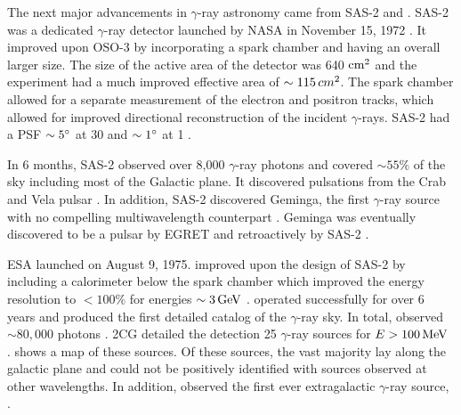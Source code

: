 The next major advancements in $\gamma$-ray astronomy
came from \ac{SAS-2} and \cosb.  \Ac{SAS-2} was a dedicated
$\gamma$-ray detector launched by \ac{NASA} in November 15, 1972
\cite{fichtel_1975_high-energy-gamma-ray}. It improved upon \ac{OSO-3}
by incorporating a spark chamber and having an overall larger size.
The size of the active area of the detector was 640 $\text{cm}^2$ and the
experiment had a much improved effective area of $\sim 115\,
cm^2$. The spark chamber allowed for a separate measurement of the
electron and positron tracks, which allowed for improved directional
reconstruction of the incident $\gamma$-rays. \Ac{SAS-2} had a PSF
$\sim5^\circ$ at 30 \mev and $\sim1^\circ$ at 1 \gev.

In 6 months, \ac{SAS-2} observed over 8,000 $\gamma$-ray
photons and covered $\sim55\%$ of the sky including most of
the Galactic plane.  It discovered pulsations from the Crab
\citep{fichtel_1975_high-energy-gamma-ray} and Vela pulsar
\citep{thompson_1977_sas-2-high-energy}.  In addition, \ac{SAS-2}
discovered Geminga, the first $\gamma$-ray source with no compelling
multiwavelength counterpart \citep{thompson_1977_final-sas-2}. Geminga
was eventually discovered to be a pulsar by \ac{EGRET}
\citep{bertsch_1992_pulsed-high-energy} and retroactively by \ac{SAS-2}
\citep{mattox_1992_observation-pulsed}.

\ac{ESA} launched \cosb on August 9, 1975.
\cosb improved upon
the design of \ac{SAS-2} by including a calorimeter below the spark
chamber which improved the energy resolution to $<100\%$ for energies
$\sim 3\,\text{GeV}$ \citep{bignami_1975_cos-b-experiment}.  
\cosb operated successfully for over 6 years and produced the first
detailed catalog of the $\gamma$-ray sky.  In total, \cosb observed $\sim
80,000$ photons \citep{mayer-hasselwander_1982_large-scale-distribution}.
\Ac{2CG} detailed the detection 25 $\gamma$-ray sources for
$E>100\,\text{MeV}$ \citep{swanenburg_1981_second-catalog}.
 shows a map of these sources.  Of these sources,
the vast majority lay along the galactic plane and could not be positively
identified with sources observed at other wavelengths.  In addition,
\cosb observed the first ever extragalactic $\gamma$-ray source,
\citep[3C273,][]{swanenburg_1978_observation-high-energy}.

